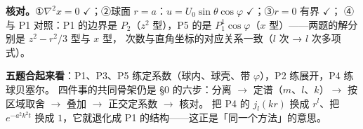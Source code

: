 \textbf{核对。}①$\nabla^2x=0$ $\checkmark$；②球面 $r=a$：$u=U_0\sin\theta\cos\varphi$ $\checkmark$；③$r=0$ 有界 $\checkmark$；
④与 P1 对照：P1 的边界是 $P_2$（$z^2$ 型），P5 的是 $P_1^1\cos\varphi$（$x$ 型）——两题的解分别是 $z^2-r^2/3$ 型与 $x$ 型，
次数与直角坐标的对应关系一致（$l$ 次 → $l$ 次多项式）。

\flowerrule

\textbf{五题合起来看}：P1、P3、P5 练定系数（球内、球壳、带 $\varphi$），P2 练展开，P4 练球贝塞尔。
四件事的共同骨架仍是 \S0 的六步：分离 $\to$ 定谱（$m$、$l$、$k$）$\to$ 按区域取舍 $\to$ 叠加 $\to$ 正交定系数 $\to$ 核对。
把 P4 的 $j_l(kr)$ 换成 $r^l$、把 $e^{-a^2k^2t}$ 换成 $1$，它就退化成 P1 的结构——这正是「同一个方法」的意思。



